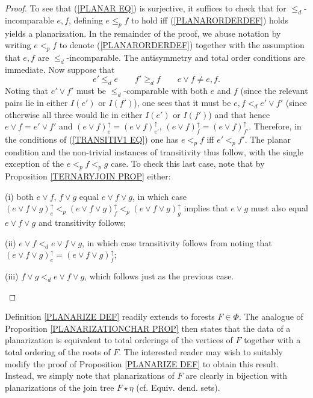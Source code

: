 \documentclass[a4paper,10pt]{article}%
\begin{document}
\begin{proof}
To see that (\ref{PLANAR EQ}) is surjective, it suffices to check that for $\leq_d$-incomparable $e,f$, defining $e \leq_p f$ to hold iff 
(\ref{PLANARORDERDEF}) holds yields a planarization. 
In the remainder of the proof, we abuse notation by writing $e<_p f$ to denote (\ref{PLANARORDERDEF}) together with the assumption that $e,f$ are $\leq_d$-incomparable. The antisymmetry and total order conditions are immediate. Now suppose that
\begin{equation}\label{TRANSITIV1 EQ}
	e' \leq_d e \qquad  f' \geq_d f \qquad e \vee f \neq e,f.
\end{equation}
Noting that $e' \vee f'$ must be $\leq_d$-comparable with both $e$ and $f$ (since the relevant pairs lie in either $I(e')$ or $I(f')$), one sees that it must be $e,f <_d  e' \vee f'$ (since otherwise all three would lie in either $I(e')$ or $I(f')$) and that hence
$e \vee f = e' \vee f'$ and 
$(e \vee f)^{\uparrow}_e=(e \vee f)^{\uparrow}_{e'}$, 
$(e \vee f)^{\uparrow}_f=(e \vee f)^{\uparrow}_{f'}$. 
Therefore, in the conditions of (\ref{TRANSITIV1 EQ}) one has 
$e <_p f$ iff $e'<_p f'$. The planar condition and the non-trivial instances of transitivity thus follow, with the single exception of the $e <_p f <_p g$ case. 
To check this last case, note that by Proposition \ref{TERNARYJOIN PROP} either:
\begin{inparaenum}
	\item[(i)] both  
$e \vee f$, $f \vee g$ equal $e \vee f \vee g$, in which case  
 $(e \vee f \vee g)^{\uparrow}_e <_p
(e \vee f \vee g)^{\uparrow}_f <_p
(e \vee f \vee g)^{\uparrow}_g 
 $ 
implies that $e \vee g$ must also equal $e \vee f \vee g$ and transitivity follows;
	\item[(ii)] $e \vee f <_d e \vee f \vee g$, in which case 
	transitivity follows from noting that 
	$(e \vee f \vee g)^{\uparrow}_e = (e \vee f \vee g)^{\uparrow}_f$;
	\item[(iii)] $f \vee g <_d e \vee f \vee g$, which follows just as the previous case.
\end{inparaenum}
\end{proof}

\begin{remark}
	Definition \ref{PLANARIZE DEF} readily extends to forests $F \in \Phi$. The analogue of Proposition \ref{PLANARIZATIONCHAR PROP} then states that the data of a planarization is equivalent to total orderings of the vertices of $F$ together with a total ordering of the roots of $F$. The interested reader may wish to suitably modify the proof of Proposition \ref{PLANARIZE DEF} to obtain this result. Instead, we simply note that planarizations of $F$ are clearly in bijection with planarizations of the join tree $F \star \eta$ (cf. {\color{green} Equiv. dend. sets}).
\end{remark}
\end{document}
